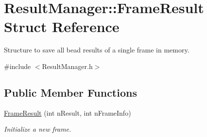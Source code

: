 \hypertarget{struct_result_manager_1_1_frame_result}{}\section{Result\+Manager\+:\+:Frame\+Result Struct Reference}
\label{struct_result_manager_1_1_frame_result}


Structure to save all bead results of a single frame in memory.  




{\ttfamily \#include $<$Result\+Manager.\+h$>$}

\subsection*{Public Member Functions}
\begin{DoxyCompactItemize}
\item 
\hyperlink{struct_result_manager_1_1_frame_result_a2d8d206f9a774cd500cb3a3c5301b0e6}{Frame\+Result} (int n\+Result, int n\+Frame\+Info)
\begin{DoxyCompactList}\small\item\em Initialize a new frame. \end{DoxyCompactList}\end{DoxyCompactItemize}

